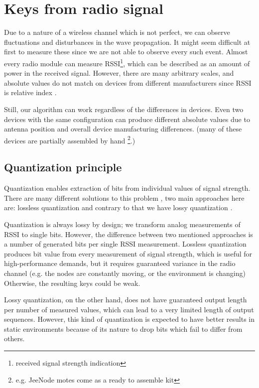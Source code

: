 \documentclass[
  print, %
  Table,   %
  nolof,     %
  nolot,     %
           oneside
]{fithesis3}
\begin{document}
  \section{Keys from radio signal}
  Due to a nature of a wireless channel which is not perfect, we can observe fluctuations and disturbances in the wave propagation. It might seem difficult at first to measure these since we are not able to observe every such event. Almost every radio module can measure RSSI\footnote{received signal strength indication}, which can be described as an amount of power in the received signal. However, there are many arbitrary scales, and absolute values do not match on devices from different manufacturers since RSSI is relative index \cite{RSSIMeaning}.

  Still, our algorithm can work regardless of the differences in devices. Even two devices with the same configuration can produce different absolute values due to antenna position and overall device manufacturing differences. (many of these devices are partially assembled by hand \footnote{e.g. JeeNode motes come as a ready to assemble kit}.)

  \subsection{Quantization principle}
    Quantization enables extraction of bits from individual values of signal strength. There are many different solutions to this problem \cite{Jana2009Rssi}, two main approaches here are: lossless quantization \cite{Azimi-Sadjadi2010Fading} and contrary to that we have lossy quantization \cite{Mathur2008Rssi}.

    Quantization is always lossy by design; we transform analog measurements of RSSI to single bits. However, the difference between two mentioned approaches is a number of generated bits per single RSSI measurement. Lossless quantization produces bit value from every measurement of signal strength, which is useful for high-performance demands, but it requires guaranteed variance in the radio channel (e.g. the nodes are constantly moving, or the environment is changing) Otherwise, the resulting keys could be weak.

    Lossy quantization, on the other hand, does not have guaranteed output length per number of measured values, which can lead to a very limited length of output sequences. However, this kind of quantization is expected to have better results in static environments \cite{Jana2009Rssi} because of its nature to drop bits which fail to differ from others.
\end{document}
